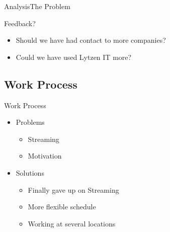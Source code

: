 \begin{frame}{Analysis}{The Problem}
    \begin{block}{Feedback?}
    \begin{itemize}
        \item Should we have had contact to more companies?
        \item Could we have used Lytzen IT more?
    \end{itemize}
    \end{block}
\end{frame}

\subsection{Work Process}
\begin{frame}{Work Process}
    \begin{itemize}
        \item Problems
        \begin{itemize}
            \item Streaming
            \item Motivation
        \end{itemize}
        \item Solutions
        \begin{itemize}
            \item Finally gave up on Streaming
            \item More flexible schedule
            \item Working at several locations
        \end{itemize}
    \end{itemize}
\end{frame}